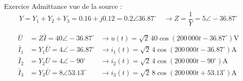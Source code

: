 \begin{frame}[allowframebreaks]{Exercice}
		Admittance vue de la source :
		\[Y=Y_1+Y_2+Y_3=0.16+j0.12=0.2\angle 36.87^{\circ} \quad \rightarrow
		Z=\frac{1}{Y}=5\angle -36.87^{\circ}\]
		
		\begin{align*}
		\bar{U}&=Z\bar{I}=40\angle -36.87^{\circ}  &\rightarrow
		u(t)=\sqrt{2}\,40\cos(200\,000 t - 36.87^{\circ}) \text{V}\\
		\bar{I}_1&=Y_1\bar{U}=4\angle -36.87^{\circ}  &\rightarrow
		i_1(t)=\sqrt{2}\,4\cos(200\,000 t - 36.87^{\circ})\text{A} \\
		\bar{I}_2&=Y_2\bar{U}=4\angle -90^{\circ}  &\rightarrow
		i_2(t)=\sqrt{2}\,4\cos(200\,000 t - 90^{\circ})\text{A} \\
		\bar{I}_3&=Y_3\bar{U}=8\angle 53.13^{\circ}  &\rightarrow
		i_3(t)=\sqrt{2}\,8\cos(200\,000 t + 53.13^{\circ})\text{A}
		\end{align*}
\end{frame}